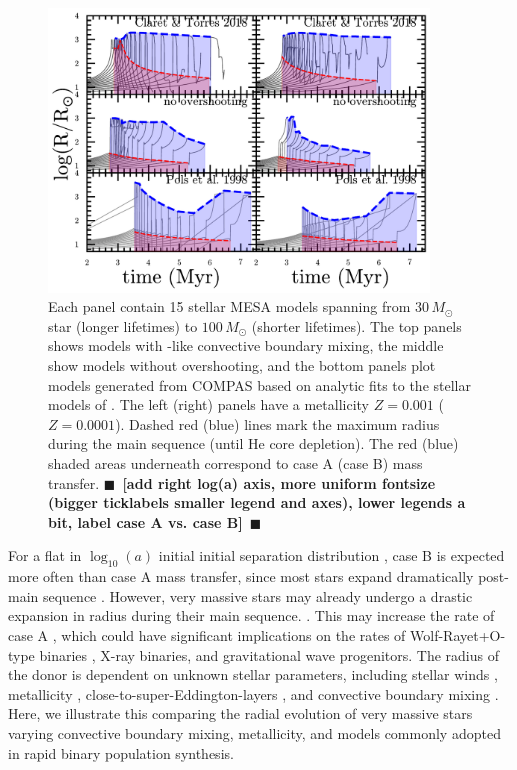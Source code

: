 \documentclass[twocolumn]{aastex63}
\newcommand{\todo}[1]{{\large $\blacksquare$~\textbf{\color{red}[#1]}}~$\blacksquare$}
\begin{document}
\begin{figure}[htbp]
  \centering
  \includegraphics[width=0.9\textwidth]{radii}
  \caption{Each panel contain 15 stellar \textsc{MESA} models spanning
    from $30 \, M_{\odot}$ star (longer lifetimes) to
    $100 \, M_{\odot}$ (shorter lifetimes). The top panels shows
    models with \cite{brott:11}-like convective boundary mixing, the
    middle show models without overshooting, and the bottom panels
    plot models generated from \textsc{COMPAS} based on analytic fits
    to the stellar models of \cite{pols:98}. The left (right) panels
    have a metallicity $Z=0.001$ ($Z=0.0001$). Dashed red (blue) lines
    mark the maximum radius during the main sequence (until He core
    depletion). The red (blue) shaded areas underneath correspond to
    case A (case B) mass transfer. \todo{add right log(a) axis, more
      uniform fontsize (bigger ticklabels smaller legend and axes),
      lower legends a bit, label case A vs. case B}}
  \label{fig:radii}
\end{figure}


For a flat in $\log_{10}(a)$ initial initial separation distribution
\citep{opik:24}, case B is expected more often than case A mass
transfer, since most stars expand dramatically post-main sequence
\citep{vandenheuvel:69}. However, very massive stars may already
undergo a drastic expansion in radius during their main sequence.
\citep[e.g.,][]{sanyal:15, jiang:15, sabhahit:24}. This may increase
the rate of case A \citep{demink:08}, which could have significant
implications on the rates of Wolf-Rayet+O-type binaries
\citep[e.g.,][]{nuijten:24}, X-ray binaries, and gravitational wave
progenitors. The radius of the donor is dependent on unknown stellar
parameters, including stellar winds \citep{renzo:17, josiek:24},
metallicity \citep{xin:22}, close-to-super-Eddington-layers
\citep[e.g.,][]{joss:73, paxton:13, jiang:15, agrawal:22, jermyn:23},
and convective boundary mixing \citep{anders:23, johnston:24}. Here,
we illustrate this comparing the radial evolution of very massive
stars varying convective boundary mixing, metallicity, and models
commonly adopted in rapid binary population synthesis.
\end{document}
